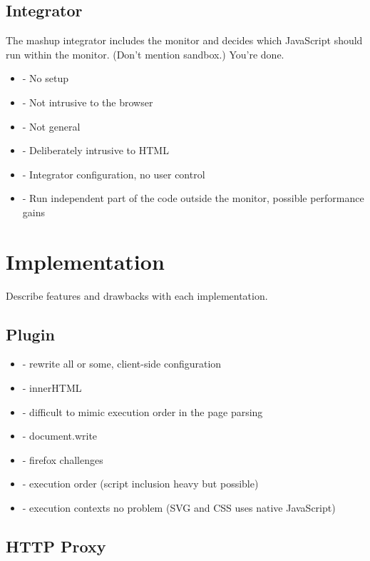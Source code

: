 \documentclass{llncs}
\begin{document}
\subsection{Integrator}

The mashup integrator includes the monitor and decides which JavaScript should 
run within the monitor. (Don't mention sandbox.) You're done.
\begin{itemize}
\item- No setup
\item- Not intrusive to the browser
\item- Not general
\item- Deliberately intrusive to HTML
\item- Integrator configuration, no user control
\item- Run independent part of the code outside the monitor, possible performance gains
\end{itemize}


\section{Implementation}
\label{sec:impl}

Describe features and drawbacks with each implementation.


\subsection{Plugin}

\begin{itemize}
\item- rewrite all or some, client-side configuration
\item- innerHTML
\item- difficult to mimic execution order in the page parsing
\item- document.write
\item- firefox challenges
\item- execution order (script inclusion heavy but possible)
\item- execution contexts no problem (SVG and CSS uses native JavaScript)
\end{itemize}

\subsection{HTTP Proxy}
\end{document}
